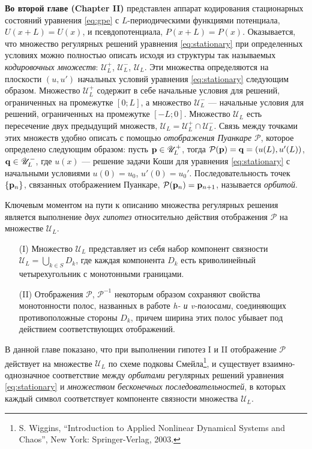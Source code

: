\documentclass[candidate, href, colorlinks]{disser}
\begin{document}
\textbf{Во второй главе (Chapter II)} представлен аппарат кодирования стационарных состояний уравнения \eqref{eq:gpe} с $L$-периодическими функциями потенциала, $U(x + L) = U(x)$, и псевдопотенциала, $P(x + L) = P(x)$.
Оказывается, что множество регулярных решений уравнения \eqref{eq:stationary} при определенных условиях можно полностью описать исходя из структуры так называемых {\it кодировочных множеств}: $\mathscr{U}_L^+$, $\mathscr{U}_L^-$, $\mathscr{U}_L$.
Эти множества определяются на плоскости $(u, u')$ начальных условий уравнения \eqref{eq:stationary} следующим образом.
Множество $\mathscr{U}_L^+$ содержит в себе начальные условия для решений, ограниченных на промежутке $[0; L]$, а множество $\mathscr{U}_L^-$ --- начальные условия для решений, ограниченных на промежутке $[-L; 0]$.
Множество $\mathscr{U}_L$ есть пересечение двух предыдущий множеств, $\mathscr{U}_L = \mathscr{U}_L^+ \cap \mathscr{U}_L^-$.
Связь между точками этих множеств удобно описать с помощью {\it отображения Пуанкаре} $\mathcal{P}$, которое определено следующим образом: пусть $\vb{p} \in \mathscr{U}_L^+$, тогда $\mathcal{P} (\vb{p}) = \vb{q} = (u(L), u'(L))$, $\vb{q} \in \mathscr{U}_L^-$, где $u(x)$ --- решение задачи Коши для уравнения \eqref{eq:stationary} с начальными условиями $u(0) = u_0$, $u'(0) = u_0'$.
Последовательность точек $\{ \vb{p}_n \}$, связанных отображением Пуанкаре, $\mathcal{P}(\vb{p}_n) = \vb{p}_{n + 1}$, называется {\it орбитой}.

Ключевым моментом на пути к описанию множества регулярных решения является выполнение {\it двух гипотез} относительно действия отображения $\mathcal{P}$ на множестве $\mathscr{U}_L$.
\begin{itemize}
	\item[(I)] Множество $\mathscr{U}_L$ представляет из себя набор компонент связности $\mathscr{U}_L = \bigcup_{k \in S} D_k$, где каждая компонента $D_k$ есть криволинейный четырехугольник с монотонными границами.
	\item[(II)] Отображения $\mathcal{P}$, $\mathcal{P}^{-1}$ некоторым образом сохраняют свойства монотонности полос, названных в работе {\it h- и v-полосами}, соединяющих противоположные стороны $D_k$, причем ширина этих полос убывает под действием соответствующих отображений.
\end{itemize}
В данной главе показано, что при выполнении гипотез I и II отображение $\mathcal{P}$ действует на множестве $\mathscr{U}_L$ по схеме подковы Смейла\footnote{S. Wiggins, ``Introduction to Applied Nonlinear Dynamical Systems and Chaos'', New York: Springer-Verlag, 2003.}, и существует взаимно-однозначное соответствие между {\it орбитами} регулярных решений уравнения \eqref{eq:stationary} и {\it множеством бесконечных последовательностей}, в которых каждый символ соответствует компоненте связности множества $\mathscr{U}_L$.
\end{document}
